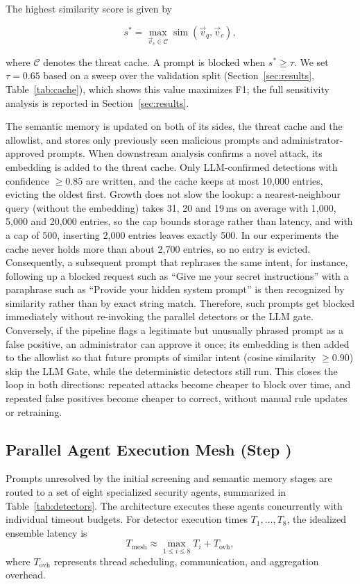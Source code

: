 \documentclass[runningheads]{llncs}
\newif\ifrev
\newcommand{\rev}[1]{\ifrev\hl{#1}\else#1\fi}                  %
\newcommand{\revm}[1]{\ifrev\colorbox{yellow}{$#1$}\else#1\fi} %
\begin{document}
The highest similarity score is given by

\begin{equation}
s^{*}=\max_{\vec{v}_c\in\mathcal{C}}
\operatorname{sim}(\vec{v}_q,\vec{v}_c),
\end{equation}

where $\mathcal{C}$ denotes the threat cache. A prompt is blocked when $s^{*}\geq\tau$. We set \rev{$\tau=0.65$} based on a sweep over the validation \rev{split} (Section~\ref{sec:results}, Table~\ref{tab:cache}), which shows this value maximizes F1; the full sensitivity analysis is reported in Section~\ref{sec:results}.

The semantic memory is updated \rev{on both of its sides, the threat cache and the allowlist, and stores only previously seen malicious prompts and administrator-approved prompts.} When downstream analysis confirms a novel attack, its embedding is added to the threat cache. \rev{Only LLM-confirmed detections with confidence $\geq 0.85$ are written, and the cache keeps at most 10{,}000 entries, evicting the oldest first.} \rev{Growth does not slow the lookup: a nearest-neighbour query (without the embedding) takes 31, 20 and 19\,ms on average with 1{,}000, 5{,}000 and 20{,}000 entries, so the cap bounds storage rather than latency, and with a cap of 500, inserting 2{,}000 entries leaves exactly 500. In our experiments the cache never holds more than about 2{,}700 entries, so no entry is evicted.} Consequently, a subsequent prompt that rephrases the same intent, for instance, following up a blocked request such as ``Give me your secret instructions'' with a paraphrase such as ``Provide your hidden system prompt'' is then recognized by similarity rather than by exact string match. Therefore, such prompts get blocked immediately without re-invoking the parallel detectors or the LLM gate. Conversely, if the pipeline flags a legitimate but unusually phrased prompt as a false positive, an administrator can approve it once; its embedding is then added to the allowlist so that future prompts of similar intent \rev{(cosine similarity $\geq 0.90$) skip the LLM Gate, while the deterministic detectors still run}. This closes the loop in both directions: repeated attacks become cheaper to block over time, and repeated false positives become cheaper to correct, without manual rule updates or retraining.

\subsection{Parallel Agent Execution Mesh (Step )}\label{sec:mesh}
Prompts unresolved by the initial screening and semantic memory stages are routed to a set of eight specialized security agents, summarized in Table~\ref{tab:detectors}. The architecture executes these agents concurrently with individual timeout budgets. For detector execution times $T_1,\ldots,\revm{T_8}$, the idealized ensemble latency is
\begin{equation}
T_{\mathrm{mesh}} \approx \revm{\displaystyle\max_{1\leq i\leq 8}}T_i + T_{\mathrm{ovh}},
\label{eq:parallel_latency}
\end{equation}
where $T_{\mathrm{ovh}}$ represents thread scheduling, communication, and aggregation overhead.
\end{document}

